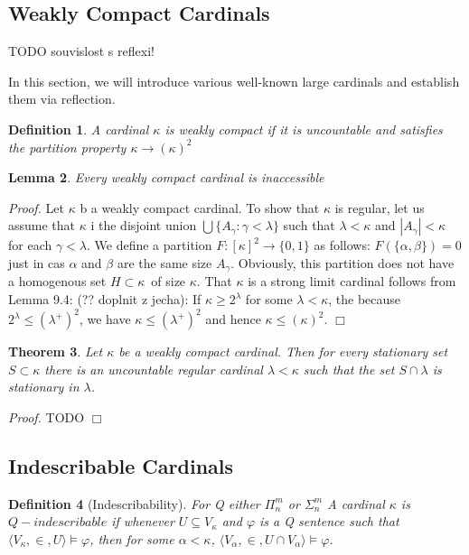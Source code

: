 \documentclass[12pt,a4paper]{article}
\newtheorem{theorem}{Theorem}[section]
\newtheorem{definition}[theorem]{Definition}
\newtheorem{lemma}[theorem]{Lemma}
\newenvironment{proof}
{\noindent \textit{Proof.}}
{\hspace*{\fill} $\Box$}
\newcommand{\then}{\rightarrow}
\begin{document}
\subsection{Weakly Compact Cardinals}
TODO souvislost s reflexi!

In this section, we will introduce various well-known large cardinals and establish them via reflection.
\begin{definition}
A cardinal $\kappa$ is \emph{weakly compact} if it is uncountable and satisfies the partition property $\kappa \then (\kappa)^2$
\end{definition}

\begin{lemma}
Every weakly compact cardinal is inaccessible
\end{lemma}

\begin{proof}
Let $\kappa$ b a weakly compact cardinal. To show that $\kappa$ is regular, let us assume that $\kappa$ i the disjoint union
$\bigcup\{A_{\gamma}: \gamma < \lambda\}$ such that $\lambda < \kappa$ and $|A_{\gamma}| < \kappa$ for each $\gamma < \lambda$.
 We define a partition $F: [\kappa]^2 \then \{0, 1\}$ as follows: $F(\{\alpha, \beta\}) = 0$ just in cas $\alpha$ and $\beta$ are the same size $A_{\gamma}$. Obviously, this partition does not have a homogenous set $H \subset \kappa$ of size $\kappa$.
That $\kappa$ is a strong limit cardinal follows from Lemma 9.4: (?? doplnit z jecha): If $\kappa \geq 2^{\lambda}$ for some $\lambda < \kappa$,
the because $2^{\lambda} \leq (\lambda^{+})^2$, we have $\kappa \leq (\lambda^{+})^2$ and hence $\kappa \leq (\kappa)^2$.
\end{proof}

\begin{theorem}\label{th:refl_weakly_compact}
Let $\kappa$ be a weakly compact cardinal. Then for every stationary set $S \subset \kappa$ there is an uncountable regular cardinal $\lambda < \kappa$ such that the set $S \cap \lambda$ is stationary in $\lambda$.
\end{theorem}
\begin{proof}
TODO
\end{proof}

\subsection{Indescribable Cardinals}
\begin{definition}[Indescribability]
For Q either $\Pi^m_n$ or $\Sigma^m_n$\newline
A cardinal $\kappa$ is \emph{$Q-indescribable$} if whenever
$U \subseteq V_\kappa$ and $\varphi$ is a Q sentence such that $\langle V_\kappa, \in, U \rangle \models \varphi$, then for some $\alpha < \kappa$, $\langle V_\alpha, \in, U \cap V_\alpha \rangle \models \varphi$.
\end{definition}
\end{document}
